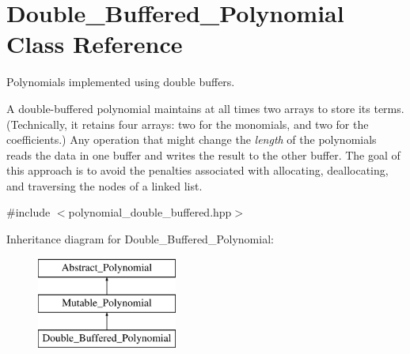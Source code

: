 \hypertarget{class_double___buffered___polynomial}{}\section{Double\+\_\+\+Buffered\+\_\+\+Polynomial Class Reference}
\label{class_double___buffered___polynomial}


Polynomials implemented using double buffers.

A double-\/buffered polynomial maintains at all times two arrays to store its terms. (Technically, it retains four arrays\+: two for the monomials, and two for the coefficients.) Any operation that might change the {\itshape length} of the polynomials reads the data in one buffer and writes the result to the other buffer. The goal of this approach is to avoid the penalties associated with allocating, deallocating, and traversing the nodes of a linked list.  




{\ttfamily \#include $<$polynomial\+\_\+double\+\_\+buffered.\+hpp$>$}

Inheritance diagram for Double\+\_\+\+Buffered\+\_\+\+Polynomial\+:\begin{figure}[H]
\begin{center}
\leavevmode
\includegraphics[height=3.000000cm]{class_double___buffered___polynomial}
\end{center}
\end{figure}
